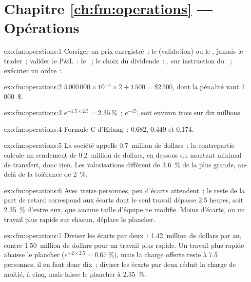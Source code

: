 \section*{Chapitre \ref{ch:fm:operations} --- Opérations}

\begin{solution}{exo:fm:operations:1}
Corriger un prix enregistré~: le  (validation) ou le , jamais le trader~; valider le P\&L~: le ~; le choix du dividende~: , sur instruction du ~; exécuter un ordre~: .
\end{solution}

\begin{solution}{exo:fm:operations:2}
$5\,000\,000\times10^{-4}\times2+1\,500=\$2\,500$, dont la pénalité vaut 1\,000~\$.
\end{solution}

\begin{solution}{exo:fm:operations:3}
$e^{-1.5\times2.5}=2.35~\%$~; $e^{-15}$, soit environ trois sur dix millions.
\end{solution}

\begin{solution}{exo:fm:operations:4}
Formule C d'Erlang~: 0.682, 0.449 et 0.174.
\end{solution}

\begin{solution}{exo:fm:operations:5}
La société appelle 0.7~million de dollars~; la contrepartie calcule un rendement de 0.2~million de dollars, en dessous du montant minimal de transfert, donc rien. Les valorisations
diffèrent de 3.6~\% de la plus grande, au-delà de la tolérance de 2~\%.
\end{solution}

\begin{solution}{exo:fm:operations:6}
Avec treize personnes, peu d'écarts attendent~; le reste de la part de retard correspond aux écarts dont le seul travail dépasse 2.5 heures, soit 2.35~\% d'entre eux, que
aucune taille d'équipe ne modifie. Moins d'écarts, ou un travail plus rapide sur chacun, déplace le plancher.
\end{solution}

\begin{solution}{exo:fm:operations:7}
Diviser les écarts par deux~: 1.42~million de dollars par an, contre 1.50~million de dollars pour un travail plus rapide. Un travail plus rapide abaisse le plancher ($e^{-2\times2.5}=0.67~\%$), mais la
charge offerte reste à 7.5 personnes, il en faut donc dix~; diviser les écarts par deux réduit la charge de moitié, à cinq, mais laisse le plancher à 2.35~\%.
\end{solution}

